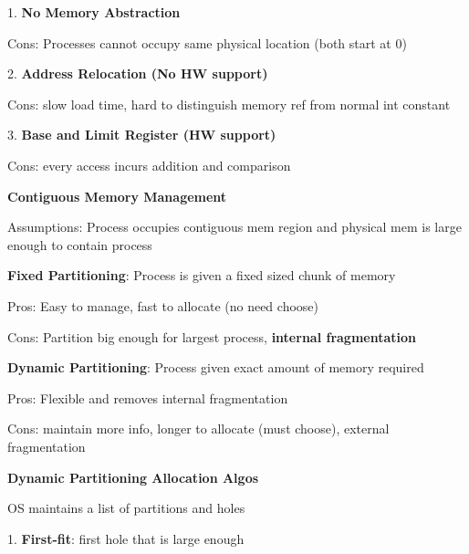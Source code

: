 \documentclass[10pt, a4paper]{article}
\newcommand{\highlight}[1]{{\color{red}\textbf{#1}}}
\newcommand{\red}[1]{{\color{red}#1}}
\newcommand{\green}[1]{{\color{ForestGreen}#1}}
\begin{document}
\begin{multicols*}{3}
		1. \textbf{No Memory Abstraction}


		\red{Cons}: Processes cannot occupy same physical location (both start at 0)

		2. \textbf{Address Relocation (No HW support)}

		\red{Cons}: slow load time, hard to distinguish memory ref from normal int constant

		3. \textbf{Base and Limit Register (HW support)}



		\red{Cons}: every access incurs addition and comparison




		\textbf{Contiguous Memory Management}

		Assumptions: Process occupies \red{contiguous mem region} and physical mem is large enough to contain process

		\textbf{Fixed Partitioning}: Process is given a fixed sized chunk of memory

		\green{Pros}: Easy to manage, fast to allocate (no need choose)

		\red{Cons}: Partition big enough for largest process, \highlight{internal fragmentation}

		\textbf{Dynamic Partitioning}: Process given exact amount of memory required

		\green{Pros:} Flexible and removes internal fragmentation

		\red{Cons}: maintain more info, longer to allocate (must choose), external fragmentation

		\textbf{Dynamic Partitioning Allocation Algos}

		OS maintains a list of partitions and holes

		1. \textbf{First-fit}: first hole that is large enough


\end{multicols*}
\end{document}
